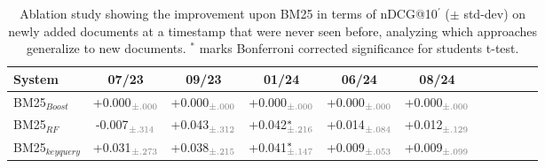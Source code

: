 \begin{table}[t]
\small
\centering
\renewcommand{\tabcolsep}{2.8pt}
\caption{Ablation study showing the improvement upon BM25 in terms of nDCG@10$^{'}$ ($\pm$ std-dev) on newly added documents at a timestamp that were never seen before, analyzing which approaches generalize to new documents. $^{*}$ marks Bonferroni corrected significance for students t-test.}
\label{tab:table-results-fold}

\begin{tabular}{@{}lcccccccccc@{}}
    \toprule
    \bfseries System & \bfseries 07/23 & \bfseries 09/23 & \bfseries 01/24 & \bfseries 06/24 & \bfseries 08/24 \\
    
    \midrule

    
    BM25$_{Boost}$ & +0.000$^{\phantom{*}}_{\color{gray}\pm.000}$ & +0.000$^{\phantom{*}}_{\color{gray}\pm.000}$ & +0.000$^{\phantom{*}}_{\color{gray}\pm.000}$ & +0.000$^{\phantom{*}}_{\color{gray}\pm.000}$ & +0.000$^{\phantom{*}}_{\color{gray}\pm.000}$ \\
    BM25$_{RF}$ & -0.007$^{\phantom{*}}_{\color{gray}\pm.314}$ & +0.043$^{\phantom{*}}_{\color{gray}\pm.312}$ & +0.042$^{*}_{\color{gray}\pm.216}$ & +0.014$^{\phantom{*}}_{\color{gray}\pm.084}$ & +0.012$^{\phantom{*}}_{\color{gray}\pm.129}$ \\
    BM25$_{keyquery}$ & +0.031$^{\phantom{*}}_{\color{gray}\pm.273}$ & +0.038$^{\phantom{*}}_{\color{gray}\pm.215}$ & +0.041$^{*}_{\color{gray}\pm.147}$ & +0.009$^{\phantom{*}}_{\color{gray}\pm.053}$ & +0.009$^{\phantom{*}}_{\color{gray}\pm.099}$ \\



\bottomrule
\end{tabular}
\end{table}
